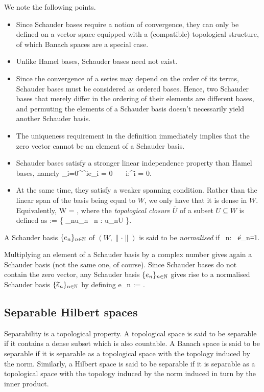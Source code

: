\noindent We note the following points.
\begin{itemize}
\item Since Schauder bases require a notion of convergence, they can only be defined on a vector space equipped with a (compatible) topological structure, of which Banach spaces are a special case.
\item Unlike Hamel bases, Schauder bases need not exist.
\item Since the convergence of a series may depend on the order of its terms, Schauder bases must be considered as ordered bases. Hence, two Schauder bases that merely differ in the ordering of their elements are different bases, and permuting the elements of a Schauder basis doesn't necessarily yield another Schauder basis.
\item The uniqueness requirement in the definition immediately implies that the zero vector cannot be an element of a Schauder basis. 
\item Schauder bases satisfy a stronger linear independence property than Hamel bases, namely
\bse
\sum_{i=0}^{\infty}\lambda^ie_i = 0 \ \Rightarrow \ \forall \, i\in \N:\lambda^i = 0.
\ese
\item At the same time, they satisfy a weaker spanning condition. Rather than the linear span of the basis being equal to $W$, we only have that it is dense in $W$. Equivalently,
\bse
W =  ,
\ese
where the \emph{topological closure} $\overline{U}$ of a subset $U\subseteq W$ is defined as
\bse
{} := \bigl\{ \lim_{n\to\infty}u_n \mid \forall \, n \in \N : u_n\in U \bigr\}.
\ese
\end{itemize}

\bd
A Schauder basis $\{e_n\}_{n\in \mathbb{N}}$ of $(W,\|\cdot\|)$ is said to be \emph{normalised} if
\bse
\forall \, n\in \N : \ \|e_n\|=1.
\ese
\ed

Multiplying an element of a Schauder basis by a complex number gives again a Schauder basis (not the same one, of course). Since Schauder bases do not contain the zero vector, any Schauder basis $\{e_n\}_{n\in \mathbb{N}}$ gives rise to a normalised Schauder basis $\{\widetilde e_n\}_{n\in \mathbb{N}}$ by defining
\bse
\widetilde e_n := .
\ese

\subsection{Separable Hilbert spaces}

Separability is a topological property. A topological space is said to be separable if it contains a dense subset which is also countable. A Banach space is said to be separable if it is separable as a topological space with the topology induced by the norm. Similarly, a Hilbert space is said to be separable if it is separable as a topological space with the topology induced by the norm induced in turn by the inner product.

